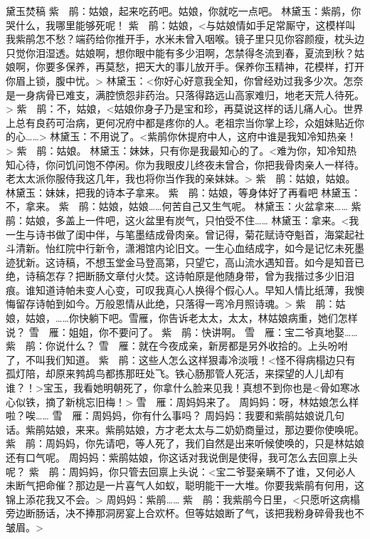 \documentclass{article}
\begin{document}
黛玉焚稿
紫　鹃：姑娘，起来吃药吧。姑娘，你就吃一点吧。
林黛玉：紫鹃，你哭什么，我哪里能够死呢！
紫　鹃：姑娘，<与姑娘情如手足常厮守，这模样叫我紫鹃怎不愁？端药给你推开手，水米未曾入咽喉。镜子里只见你容颜瘦，枕头边只觉你泪湿透。姑娘啊，想你眼中能有多少泪啊，怎禁得冬流到春，夏流到秋？姑娘啊，你要多保养，再莫愁，把天大的事儿放开手。保养你玉精神，花模样，打开你眉上锁，腹中忧。>
林黛玉：<你好心好意我全知，你曾经劝过我多少次。怎奈是一身病骨已难支，满腔愤怨非药治。只落得路远山高家难归，地老天荒人待死。>
紫　鹃：不，姑娘，<姑娘你身子乃是宝和珍，再莫说这样的话儿痛人心。世界上总有良药可治病，更何况府中都是疼你的人。老祖宗当你掌上珍，众姐妹贴近你的心……>
林黛玉：不用说了。<紫鹃你休提府中人，这府中谁是我知冷知热亲！>
紫　鹃：姑娘。
林黛玉：妹妹，只有你是我最知心的了。<难为你，知冷知热知心待，你问饥问饱不停闲。你为我眼皮儿终夜未曾合，你把我骨肉亲人一样待。老太太派你服侍我这几年，我也将你当作我的亲妹妹。>
紫　鹃：姑娘，姑娘。
林黛玉：妹妹，把我的诗本子拿来。
紫　鹃：姑娘，等身体好了再看吧
林黛玉：不，拿来。
紫　鹃：姑娘，姑娘……何苦自己又生气呢。
林黛玉：火盆拿来……
紫　鹃：姑娘，多盖上一件吧，这火盆里有炭气，只怕受不住……
林黛玉：拿来。<我一生与诗书做了闺中伴，与笔墨结成骨肉亲。曾记得，菊花赋诗夺魁首，海棠起社斗清新。怡红院中行新令，潇湘馆内论旧文。一生心血结成字，如今是记忆未死墨迹犹新。这诗稿，不想玉堂金马登高第，只望它，高山流水遇知音。如今是知音已绝，诗稿怎存？把断肠文章付火焚。这诗帕原是他随身带，曾为我揩过多少旧泪痕。谁知道诗帕未变人心变，可叹我真心人换得个假心人。早知人情比纸薄，我懊悔留存诗帕到如今。万般恩情从此绝，只落得一弯冷月照诗魂。>
紫　鹃：姑娘，姑娘，……你快躺下吧。雪雁，你告诉老太太，太太，林姑娘病重，她们怎样说？
雪　雁：姐姐，你不要问了。
紫　鹃：快讲啊。
雪　雁：宝二爷真地娶……
紫　鹃：你说什么？
雪　雁：就在今夜成亲，新房都是另外收拾的。上头吩咐了，不叫我们知道。
紫　鹃：这些人怎么这样狠毒冷淡哦！<怪不得病榻边只有孤灯陪，却原来鹁鸪鸟都拣那旺处飞。铁心肠那管人死活，来探望的人儿却有谁？！>宝玉，我看她明朝死了，你拿什么脸来见我！真想不到你也是<骨如寒冰心似铁，摘了新桃忘旧梅！>
雪　雁：周妈妈来了。
周妈妈：呀，林姑娘怎么样啦？唉……
雪　雁：周妈妈，你有什么事吗？
周妈妈：我要和紫鹃姑娘说几句话。紫鹃姑娘，来来。紫鹃姑娘，方才老太太与二奶奶商量过，那边要你使唤呢。
紫　鹃：周妈妈，你先请吧，等人死了，我们自然是出来听候使唤的，只是林姑娘还有口气呢。
周妈妈：紫鹃姑娘，你这话对我说倒是使得，我可怎么去回禀上头呢？
紫　鹃：周妈妈，你只管去回禀上头说：<宝二爷娶亲瞒不了谁，又何必人未断气把命催？那边是一片喜气人如蚁，聪明能干一大堆。你要我紫鹃有何用，这锦上添花我又不会。>
周妈妈：紫鹃……
紫　鹃：我紫鹃今日里，<只愿听这病榻旁边断肠话，决不捧那洞房宴上合欢杯。但等姑娘断了气，该把我粉身碎骨我也不皱眉。>
\end{document}
